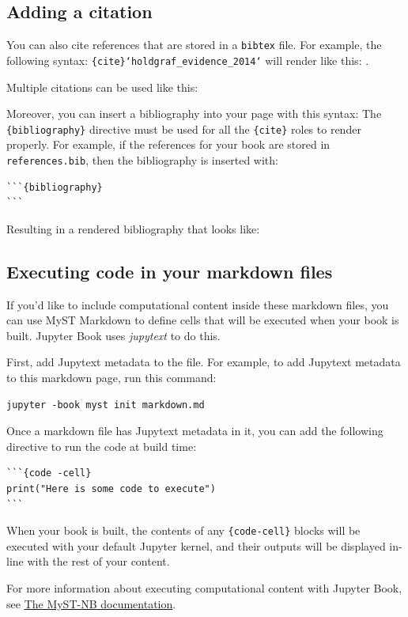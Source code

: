 \documentclass{article}
\begin{document}
\subsection{Adding a citation}

You can also cite references that are stored in a \texttt{bibtex} file. For example,
the following syntax: \texttt{\{cite\}`holdgraf\_evidence\_2014`} will render like
this: \cite{holdgraf_evidence_2014}.

Multiple citations can be used like this:
\citet{holdgraf_rapid_2016, holdgraf_encoding_2017}

Moreover, you can insert a bibliography into your page with this syntax:
The \texttt{\{bibliography\}} directive must be used for all the \texttt{\{cite\}} roles to
render properly.
For example, if the references for your book are stored in \texttt{references.bib},
then the bibliography is inserted with:

\begin{verbatim}
```{bibliography}
```
\end{verbatim}

Resulting in a rendered bibliography that looks like:

% 

\subsection{Executing code in your markdown files}

If you'd like to include computational content inside these markdown files,
you can use MyST Markdown to define cells that will be executed when your
book is built. Jupyter Book uses \textit{jupytext} to do this.

First, add Jupytext metadata to the file. For example, to add Jupytext metadata
to this markdown page, run this command:

\begin{verbatim}
jupyter -book myst init markdown.md
\end{verbatim}

Once a markdown file has Jupytext metadata in it, you can add the following
directive to run the code at build time:

\begin{verbatim}
```{code -cell}
print("Here is some code to execute")
```
\end{verbatim}

When your book is built, the contents of any \texttt{\{code-cell\}} blocks will be
executed with your default Jupyter kernel, and their outputs will be displayed
in-line with the rest of your content.

For more information about executing computational content with Jupyter Book,
see \href{https://myst-nb.readthedocs.io/}{The MyST-NB documentation}.



\end{document}
